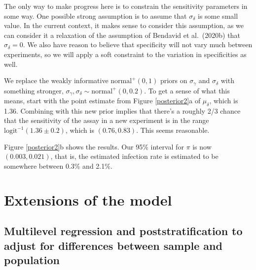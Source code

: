 \documentclass[11pt]{article}
\begin{document}
The only way to make progress here is to constrain the sensitivity parameters in some way.  One possible strong assumption is to assume that $\sigma_{\delta}$ is some small value. In the current context, it makes sense to consider this assumption, as we can consider it a relaxation of the assumption of Bendavid et al.\ (2020b) that $\sigma_{\delta} = 0$.  We also have reason to believe that specificity will not vary much between experiments, so we will apply a soft constraint to the variation in specificities as well.

We replace the weakly informative $\mbox{normal}^+(0, 1)$ priors on $\sigma_{\gamma}$ and $\sigma_{\delta}$ with something stronger, 
$\sigma_{\gamma}, \sigma_{\delta}\sim\mbox{normal}^+(0, 0.2)$.  To get a sense of what this means, start with the point estimate from Figure \ref{posterior2}a of $\mu_{\delta}$, which is 1.36. Combining with this new prior implies that there's a roughly 2/3 chance that the sensitivity of the assay in a new experiment is in the range $\mbox{logit}^{-1}(1.36 \pm 0.2)$, which is $(0.76, 0.83)$. This seems reasonable.

Figure \ref{posterior2}b shows the results.  Our 95\% interval for $\pi$ is now $(0.003, 0.021)$, that is, the estimated infection rate is estimated to be somewhere between 0.3\% and 2.1\%.


 \section{Extensions of the model}

\subsection{Multilevel regression and poststratification to adjust for differences between sample and population}\label{mrp}
\end{document}
